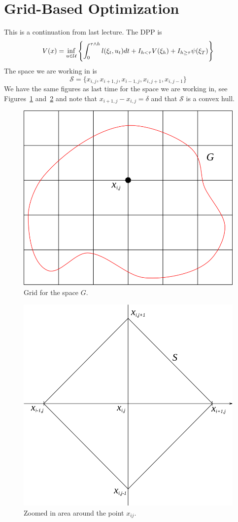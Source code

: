 \mainmatter%
\setcounter{page}{1}

\lectureseries[\course]{\course}

\date{December 1, 2009}

\setaddress%

\setcounter{lecture}{16}
\setcounter{chapter}{16}


\section{Grid-Based Optimization}
This is a continuation from last lecture.
The DPP is
$$V(x) = \inf_{u\in\mathcal{U}}\left\lbrace \int_0^{\tau\wedge h}l(\xi_t,u_t)dt + I_{h<\tau}V(\xi_h) + I_{h\geq\tau}\psi(\xi_T) \right\rbrace$$
The space we are working in is
$$\mathcal{S} = \{x_{i,j}, x_{i+1,j}, x_{i-1,j}, x_{i,j+1}, x_{i,j-1}\}$$
We have the same figures as last time for the space we are working in, see Figures~\ref{fig:17grid} and~\ref{fig:17x} and note that $x_{i+1,j}-x_{i,j}=\delta$ and that $\mathcal{S}$ is a convex hull.

\begin{figure}[ht!]
\centering
\includegraphics[width=.4\textwidth]{images/16grid}
\caption{Grid for the space $G$.}
\label{fig:17grid}
\end{figure}

\begin{figure}[ht!]
\centering
\includegraphics[width=.4\textwidth]{images/16x}
\caption{Zoomed in area around the point $x_{ij}$.}
\label{fig:17x}
\end{figure}

